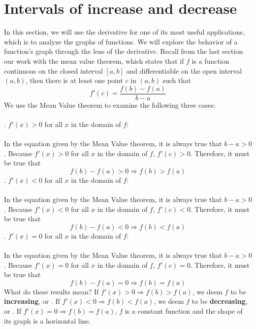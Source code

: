 \documentclass[11pt]{scrartcl}
\begin{document}
\maketitle
\noindent

\section{Intervals of increase and decrease}
\noindent
In this section, we will use the derivative for one of its most useful applications, which is to analyze the graphs of functions. We will explore the behavior of a function's graph through the lens of the derivative. Recall from the last section our work with the mean value theorem, which states that if $f$ is a function continuous on the closed interval $[a,b]$ and differentiable on the open interval $(a,b)$, then there is at least one point $c$ in $(a,b)$ such that 
$$f'(c) = \frac{f(b)-f(a)}{b-a}$$
\noindent 
We use the Mean Value theorem to examine the following three cases: \\
\\
. $f'(x)>0$ for all $x$ in the domain of $f$:\\
\\
\noindent 
In the equation given by the Mean Value theorem, it is always true that $b-a>0$. Because $f'(x)>0$ for all $x$ in the domain of $f$, $f'(c)>0$. Therefore, it must be true that 
$$f(b)-f(a)>0 \Rightarrow f(b)>f(a)$$
. $f'(x)<0$ for all $x$ in the domain of $f$: \\
\\
\noindent 
In the equation given by the Mean Value theorem, it is always true that $b-a>0$. Because $f'(x)<0$ for all $x$ in the domain of $f$, $f'(c)<0$. Therefore, it must be true that 
$$f(b)-f(a)<0 \Rightarrow f(b)<f(a)$$
. $f'(x)=0$ for all $x$ in the domain of $f$: \\
\\
\noindent 
 In the equation given by the Mean Value theorem, it is always true that $b-a>0$. Because $f'(x)=0$ for all $x$ in the domain of $f$, $f'(c)=0$. Therefore, it must be true that 
$$f(b)-f(a)=0 \Rightarrow f(b)=f(a)$$
\noindent 
What do these results mean? If $f'(x)>0 \Rightarrow f(b)>f(a)$, we deem $f$ to be \textbf{increasing}, or . If $f'(x)<0 \Rightarrow f(b)<f(a)$, we deem $f$ to be \textbf{decreasing}, or . If $f'(x)=0 \Rightarrow f(b)=f(a)$, $f$ is a constant function and the shape of its graph is a horizontal line. \\
\end{document}
